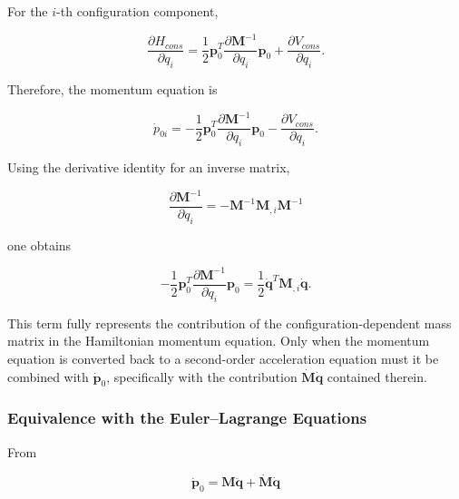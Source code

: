 For the \(i\)-th configuration component,

\begin{equation}
\label{eq:hamiltonian-3-22}
\frac{\partial H_{cons}}{\partial q_{i}} = \frac{1}{2}\mathbf{p}_{0}^{T}\frac{\partial\mathbf{M}^{- 1}}{\partial q_{i}}\mathbf{p}_{0} + \frac{\partial V_{cons}}{\partial q_{i}}.
\end{equation}

Therefore, the momentum equation is

\begin{equation}
\label{eq:hamiltonian-3-23}
\boxed{{\dot{p}}_{0i} = - \frac{1}{2}\mathbf{p}_{0}^{T}\frac{\partial\mathbf{M}^{- 1}}{\partial q_{i}}\mathbf{p}_{0} - \frac{\partial V_{cons}}{\partial q_{i}}.}
\end{equation}

Using the derivative identity for an inverse matrix,

\begin{equation}
\label{eq:hamiltonian-3-24}
\frac{\partial\mathbf{M}^{- 1}}{\partial q_{i}} = - \mathbf{M}^{- 1}\mathbf{M}_{,i}\mathbf{M}^{- 1}
\end{equation}

one obtains

\begin{equation}
\label{eq:hamiltonian-3-25}
- \frac{1}{2}\mathbf{p}_{0}^{T}\frac{\partial\mathbf{M}^{- 1}}{\partial q_{i}}\mathbf{p}_{0} = \frac{1}{2}{\dot{\mathbf{q}}}^{T}\mathbf{M}_{,i}\dot{\mathbf{q}}.
\end{equation}

This term fully represents the contribution of the configuration-dependent mass matrix in the Hamiltonian momentum equation. Only when the momentum equation is converted back to a second-order acceleration equation must it be combined with \({\dot{\mathbf{p}}}_{0}\), specifically with the contribution \(\dot{\mathbf{M}}\dot{\mathbf{q}}\) contained therein.

\subsubsection{Equivalence with the Euler--Lagrange Equations}\label{sec:hamiltonian-3-3-3}

From

\begin{equation}
\label{eq:hamiltonian-3-26}
{\dot{\mathbf{p}}}_{0} = \mathbf{M}\ddot{\mathbf{q}} + \dot{\mathbf{M}}\dot{\mathbf{q}}
\end{equation}


